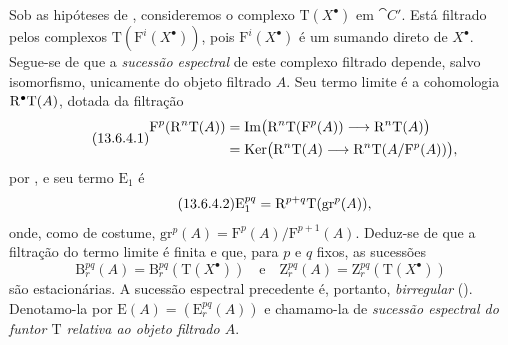 \begin{env}[13.6.4]
\label{0.13.6.4}
Sob as hipóteses de , consideremos o complexo
$\mathrm{T}(X^\bullet)$ em $\cat{C}'$.
Está filtrado pelos complexos
$\mathrm{T}(\mathrm{F}^i(X^\bullet))$, pois
$\mathrm{F}^i(X^\bullet)$ é um sumando direto de $X^\bullet$.
Segue-se de  que a \emph{sucessão espectral} de
este complexo filtrado depende, salvo isomorfismo, unicamente do
objeto filtrado $A$.
Seu termo limite é a cohomologia $\mathrm{R}^\bullet\mathrm{T}(A)$, dotada
da filtração
\begin{equation}
\label{0.13.6.4.1}
\tag{13.6.4.1}
  \begin{split}
  \mathrm{F}^p(\RR^n\mathrm{T}(A))
  &=
  \Im\bigl(
    \RR^n\mathrm{T}(\mathrm{F}^p(A))
    \longrightarrow
    \RR^n\mathrm{T}(A)
  \bigr)
  \\
  &=
  \Ker\bigl(
    \RR^n\mathrm{T}(A)
    \longrightarrow
    \RR^n\mathrm{T}(A/\mathrm{F}^p(A))
  \bigr),
  \end{split}
\end{equation}
por , e seu termo $\mathrm{E}_1$ é
\begin{equation}
\label{0.13.6.4.2}
\tag{13.6.4.2}
  \mathrm{E}_1^{pq}
  =
  \RR^{p+q}\mathrm{T}(\mathrm{gr}^p(A)),
\end{equation}
onde, como de costume,
$\mathrm{gr}^p(A)=\mathrm{F}^p(A)/\mathrm{F}^{p+1}(A)$.
Deduz-se de  que a filtração do termo limite
é finita e que, para $p$ e $q$ fixos, as sucessões
\[
  \mathrm{B}_r^{pq}(A)
  =
  \mathrm{B}_r^{pq}(\mathrm{T}(X^\bullet))
  \quad\text{e}\quad
  \mathrm{Z}_r^{pq}(A)
  =
  \mathrm{Z}_r^{pq}(\mathrm{T}(X^\bullet))
\]
são estacionárias.
A sucessão espectral precedente é, portanto, \emph{birregular}
().
Denotamo-la por
$\mathrm{E}(A)=(\mathrm{E}_r^{pq}(A))$ e chamamo-la de
\emph{sucessão espectral do funtor $\mathrm{T}$ relativa ao
objeto filtrado $A$}.
\end{env}

